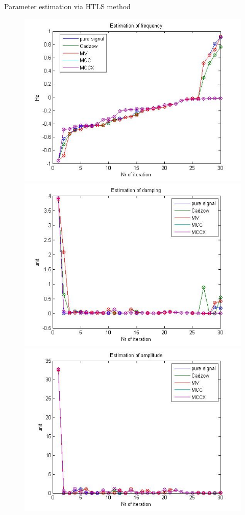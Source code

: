 \documentclass[t,12pt,english
\ifx\beamermode\undefined\else,\beamermode\fi
]{beamer}
\begin{document}
\begin{frame}{Parameter estimation via HTLS method}

\begin{figure}[!htbp]
%
\centering
\includegraphics[width=.8\textwidth]{31.jpg}
\endminipage\hfill
{}%
\centering
\includegraphics[width=.8\textwidth]{32.jpg}
\endminipage\hfill
{}%
\centering
\includegraphics[width=.8\textwidth]{33.jpg}

\end{figure}
\end{frame}
\end{document}
